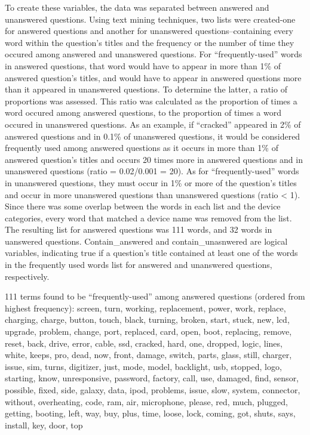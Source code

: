 \documentclass{article}
\begin{document}
  To create these variables, the data was separated between answered and unanswered questions. Using text mining techniques, two lists were created-one for answered questions and another for unanswered questions--containing every word within the question's titles and the frequency or the number of time they occured among answered and unanswered questions. For ``frequently-used'' words in answered questions, that word would have to appear in more than 1\% of answered question's titles, and would have to appear in answered questions more than it appeared in unanswered questions. To determine the latter, a ratio of proportions was assessed. This ratio was calculated as the proportion of times a word occured among answered questions, to the proportion of times a word occured in unanswered questions. As an example, if ``cracked'' appeared in 2\% of answered questions and in 0.1\% of unanswered questions, it would be considered frequently used among answered questions as it occurs in more than 1\% of answered question's titles and occurs 20 times more in answered questions and in unanswered questions (ratio = 0.02/0.001 = 20). As for ``frequently-used'' words in unanswered questions, they must occur in 1\% or more of the question's titles and occur in more unanswered questions than unanswered questions (ratio < 1). Since there was some overlap between the words in each list and the device categories, every word that matched a device name was removed from the list. The resulting list for answered questions was 111 words, and 32 words in uanswered questions. Contain\_answered and contain\_unasnwered are logical variables, indicating true if a question's title contained at least one of the words in the frequently used words list for answered and unanswered questions, respectively. 
  
111 terms found to be ``frequently-used'' among answered questions (ordered from highest frequency): 
screen, turn, working, replacement, power, work, replace, charging, charge, button, touch, black, turning, broken, start, stuck, new, lcd, upgrade, problem, change, port, replaced, card, open, boot, replacing, remove, reset, back, drive, error, cable, ssd, cracked, hard, one, dropped, logic, lines, white, keeps, pro, dead, now, front, damage, switch, parts, glass, still, charger, issue, sim, turns, digitizer, just, mode, model, backlight, usb, stopped, logo, starting, know, unresponsive, password, factory, call, use, damaged, find, sensor, possible, fixed, side, galaxy, data, ipod, problems, issue, slow, system, connector, without, overheating, code, ram, air, microphone, please, red, much, plugged, getting, booting, left, way, buy, plus, time, loose, lock, coming, got, shuts, says, install, key, door, top
\end{document}
